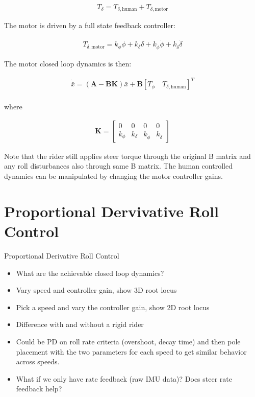\documentclass[12pt]{article}
\begin{document}
\begin{align}
  T_\delta = T_{\delta,\textrm{human}} + T_{\delta,\textrm{motor}}
\end{align}

The motor is driven by a full state feedback controller:

\begin{align}
  T_{\delta,\textrm{motor}} =
  k_\phi \phi +
  k_\delta \delta +
  k_{\dot{\phi}} \dot{\phi} +
  k_{\dot{\delta}} \dot{\delta}
\end{align}

The motor closed loop dynamics is then:

\begin{align}
  \dot{\bar{x}} = \left( \mathbf{A} - \mathbf{B} \mathbf{K} \right) \bar{x} +
  \mathbf{B} \left[ T_\phi \quad T_{\delta,\textrm{human}} \right]^T \\
\end{align}

where

\begin{align}
  \mathbf{K} =
  \begin{bmatrix}
    0 & 0 & 0 & 0 \\
    k_\phi & k_\delta & k_{\dot{\phi}} & k_{\dot{\delta}}
  \end{bmatrix}
\end{align}

Note that the rider still applies steer torque through the original B matrix
and any roll disturbances also through same B matrix. The human controlled
dynamics can be manipulated by changing the motor controller gains.

\section{Proportional Dervivative Roll Control}

Proportional Derivative Roll Control

\begin{itemize}
  \item What are the achievable closed loop dynamics?
  \item Vary speed and controller gain, show 3D root locus
  \item Pick a speed and vary the controller gain, show 2D root locus
  \item Difference with and without a rigid rider
  \item Could be PD on roll rate criteria (overshoot, decay time) and then pole
    placement with the two parameters for each speed to get similar behavior
    across speeds.
  \item What if we only have rate feedback (raw IMU data)? Does steer rate
    feedback help?
\end{itemize}
\end{document}
